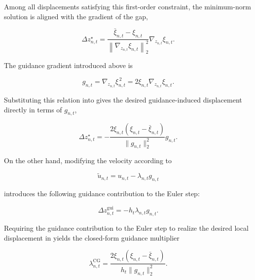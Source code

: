 Among all displacements satisfying this first-order constraint, the
minimum-norm solution is aligned with the gradient of the gap,

\begin{equation}
    \Delta z_{n,t}^{\star}
    =
    \frac{
        \bar{\xi}_{n,t}-\xi_{n,t}
    }{
        \left\|
            \nabla_{z_{n,t}}\xi_{n,t}
        \right\|_2^2
    }
    \nabla_{z_{n,t}}\xi_{n,t}.
    \label{eq:close-gap-minimum-shift}
\end{equation}

The guidance gradient introduced above is

\begin{equation}
    g_{n,t}
    =
    \nabla_{z_{n,t}}\xi_{n,t}^{\,2}
    =
    2\xi_{n,t}
    \nabla_{z_{n,t}}\xi_{n,t}.
    \label{eq:close-gap-gradient}
\end{equation}

Substituting this relation into
 gives the desired guidance-induced
displacement directly in terms of $g_{n,t}$,

\begin{equation}
    \Delta z_{n,t}^{\star}
    =
    -
    \frac{
        2\xi_{n,t}
        \left(
            \xi_{n,t}-\bar{\xi}_{n,t}
        \right)
    }{
        \lVert g_{n,t}\rVert_2^2
    }
    g_{n,t}.
    \label{eq:close-gap-shift}
\end{equation}

On the other hand, modifying the velocity according to

\begin{equation}
    \tilde{u}_{n,t}
    =
    u_{n,t}
    -
    \lambda_{n,t}g_{n,t}
\end{equation}

introduces the following guidance contribution to the Euler step:

\begin{equation}
    \Delta z_{n,t}^{\mathrm{gui}}
    =
    -h_t\lambda_{n,t}g_{n,t}.
    \label{eq:close-gap-guidance-shift}
\end{equation}

Requiring the guidance contribution to the Euler step to realize the desired
local displacement in  yields the closed-form
guidance multiplier

\begin{equation}
    \lambda_{n,t}^{\mathrm{CG}}
    =
    \frac{
        2\xi_{n,t}
        \left(
            \xi_{n,t}-\bar{\xi}_{n,t}
        \right)
    }{
        h_t
        \lVert g_{n,t}\rVert_2^2
    }.
    \label{eq:close-gap-lambda}
\end{equation}

